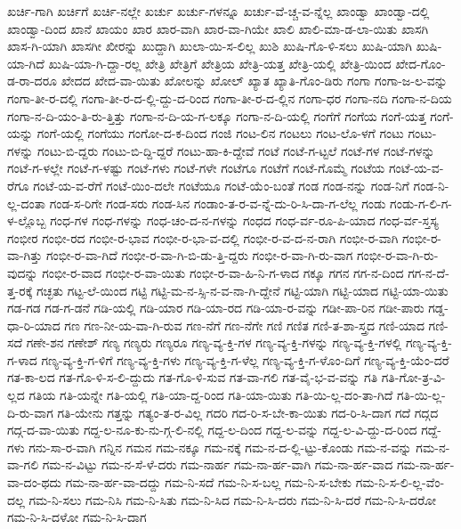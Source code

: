 {ಖರ್ಚಿ-ಗಾಗಿ
ಖರ್ಚಿಗೆ
ಖರ್ಚಿ-ನಲ್ಲೇ
ಖರ್ಚು
ಖರ್ಚು-ಗಳನ್ನೂ
ಖರ್ಚು-ವೆ-ಚ್ಚ-ವ-ನ್ನೆಲ್ಲ
ಖಾಂಡ್ವಾ
ಖಾಂಡ್ವಾ-ದಲ್ಲಿ
ಖಾಂಡ್ವಾ-ದಿಂದ
ಖಾನೆ
ಖಾಯಂ
ಖಾರ
ಖಾರ-ವಾಗಿ
ಖಾರ-ವಾ-ಗಿಯೇ
ಖಾಲಿ
ಖಾಲಿ-ಮಾ-ಡ-ಲಾ-ಯಿತು
ಖಾಸಗಿ
ಖಾಸ-ಗಿ-ಯಾಗಿ
ಖಾಸಗೀ
ಖೀರನ್ನು
ಖುದ್ದಾಗಿ
ಖುಲಾ-ಯಿ-ಸ-ಲಿಲ್ಲ
ಖುಶಿ
ಖುಷಿ-ಗೊ-ಳಿ-ಸಲು
ಖುಷಿ-ಯಾಗಿ
ಖುಷಿ-ಯಾ-ಗಿದೆ
ಖುಷಿ-ಯಾ-ಗಿ-ದ್ದಾ-ರಲ್ಲ
ಖೇತ್ರಿ
ಖೇತ್ರಿಗೆ
ಖೇತ್ರಿಯ
ಖೇತ್ರಿ-ಯತ್ತ
ಖೇತ್ರಿ-ಯಲ್ಲಿ
ಖೇತ್ರಿ-ಯಿಂದ
ಖೇದ-ಗೊಂ-ಡ-ರಾ-ದರೂ
ಖೇದದ
ಖೇದ-ವಾ-ಯಿತು
ಖೋಲನ್ನು
ಖೋಲ್
ಖ್ಯಾತ
ಖ್ಯಾತಿ-ಗೊಂ-ಡಿರು
ಗಂಗಾ
ಗಂಗಾ-ಜ-ಲ-ವನ್ನು
ಗಂಗಾ-ತೀ-ರ-ದಲ್ಲಿ
ಗಂಗಾ-ತೀ-ರ-ದ-ಲ್ಲಿ-ದ್ದು-ದ-ರಿಂದ
ಗಂಗಾ-ತೀ-ರ-ದ-ಲ್ಲಿನ
ಗಂಗಾ-ಧರ
ಗಂಗಾ-ನದಿ
ಗಂಗಾ-ನ-ದಿಯ
ಗಂಗಾ-ನ-ದಿ-ಯಂ-ತಿ-ರು-ತ್ತಿತ್ತು
ಗಂಗಾ-ನ-ದಿ-ಯ-ಗ-ಲಕ್ಕೂ
ಗಂಗಾ-ನ-ದಿ-ಯಲ್ಲಿ
ಗಂಗೆಗೆ
ಗಂಗೆಯ
ಗಂಗೆ-ಯತ್ತ
ಗಂಗೆ-ಯನ್ನು
ಗಂಗೆ-ಯಲ್ಲಿ
ಗಂಗೆಯು
ಗಂಗೋ-ದ-ಕ-ದಿಂದ
ಗಂಜಿ
ಗಂಟ-ಲಿನ
ಗಂಟಲು
ಗಂಟ-ಲೊ-ಳಗೆ
ಗಂಟು
ಗಂಟು-ಗಳನ್ನು
ಗಂಟು-ಬಿ-ದ್ದರು
ಗಂಟು-ಬಿ-ದ್ದಿ-ದ್ದರೆ
ಗಂಟು-ಹಾ-ಕಿ-ದ್ದೇವೆ
ಗಂಟೆ
ಗಂಟೆ-ಗ-ಟ್ಟಲೆ
ಗಂಟೆ-ಗಳ
ಗಂಟೆ-ಗಳನ್ನು
ಗಂಟೆ-ಗ-ಳಲ್ಲೇ
ಗಂಟೆ-ಗ-ಳಷ್ಟು
ಗಂಟೆ-ಗಳು
ಗಂಟೆ-ಗಳೇ
ಗಂಟೆಗೂ
ಗಂಟೆಗೆ
ಗಂಟೆ-ಗೊಮ್ಮೆ
ಗಂಟೆಯ
ಗಂಟೆ-ಯ-ವ-ರೆಗೂ
ಗಂಟೆ-ಯ-ವ-ರೆಗೆ
ಗಂಟೆ-ಯಿಂ-ದಲೇ
ಗಂಟೆಯೂ
ಗಂಟೆ-ಯೆಂ-ಬಂತೆ
ಗಂಡ
ಗಂಡ-ನನ್ನು
ಗಂಡ-ನಿಗೆ
ಗಂಡ-ನಿ-ಲ್ಲ-ದಂತಾ
ಗಂಡ-ಸ-ರಿಗೇ
ಗಂಡ-ಸರು
ಗಂಡ-ಸಿನ
ಗಂಡಾಂ-ತ-ರ-ವ-ನ್ನೆ-ದು-ರಿ-ಸಿ-ದಾ-ಗ-ಲೆಲ್ಲ
ಗಂಡು
ಗಂಡು-ಗ-ಲಿ-ಗ-ಳ-ಲ್ಲೊಬ್ಬ
ಗಂಧ-ಗಳ
ಗಂಧ-ಗಳನ್ನು
ಗಂಧ-ಚಂ-ದ-ನ-ಗಳನ್ನು
ಗಂಧದ
ಗಂಧ-ರ್ವ-ರೂ-ಪಿ-ಯಾದ
ಗಂಧ-ರ್ವ-ಸ್ತಸ್ಯ
ಗಂಭೀರ
ಗಂಭೀ-ರದ
ಗಂಭೀ-ರ-ಭಾವ
ಗಂಭೀ-ರ-ಭಾ-ವ-ದಲ್ಲಿ
ಗಂಭೀ-ರ-ವ-ದ-ನ-ರಾಗಿ
ಗಂಭೀ-ರ-ವಾಗಿ
ಗಂಭೀ-ರ-ವಾ-ಗಿತ್ತು
ಗಂಭೀ-ರ-ವಾ-ಗಿದೆ
ಗಂಭೀ-ರ-ವಾ-ಗಿ-ಬಿ-ಡು-ತ್ತಿ-ದ್ದರು
ಗಂಭೀ-ರ-ವಾ-ಗಿ-ರು-ವಾಗ
ಗಂಭೀ-ರ-ವಾ-ಗಿ-ರು-ವುದನ್ನು
ಗಂಭೀ-ರ-ವಾದ
ಗಂಭೀ-ರ-ವಾ-ಯಿತು
ಗಂಭೀ-ರ-ವಾ-ಹಿ-ನಿ-ಗ-ಳಾದ
ಗಕ್ಕೂ
ಗಗನ
ಗಗ-ನ-ದಿಂದ
ಗಗ-ನ-ದೆ-ತ್ತ-ರಕ್ಕೆ
ಗಚ್ಛತು
ಗಟ್ಟ-ಲೆ-ಯಿಂದ
ಗಟ್ಟಿ
ಗಟ್ಟಿ-ಮ-ನ-ಸ್ಸಿ-ನ-ವ-ನಾ-ಗಿ-ದ್ದೇನೆ
ಗಟ್ಟಿ-ಯಾಗಿ
ಗಟ್ಟಿ-ಯಾದ
ಗಟ್ಟಿ-ಯಾ-ಯಿತು
ಗಡ-ಗಡ
ಗಡ-ಗ-ಡನೆ
ಗಡಿ-ಯಲ್ಲಿ
ಗಡಿ-ಯಾರ
ಗಡಿ-ಯಾ-ರದ
ಗಡಿ-ಯಾ-ರ-ವನ್ನು
ಗಡೀ-ಪಾ-ರಿನ
ಗಡೀ-ಪಾರು
ಗಡ್ಡ-ಧಾ-ರಿ-ಯಾದ
ಗಣ
ಗಣ-ನೀ-ಯ-ವಾ-ಗಿ-ರುವ
ಗಣ-ನೆಗೆ
ಗಣ-ನೆಗೇ
ಗಣಿ
ಗಣಿತ
ಗಣಿ-ತ-ಶಾ-ಸ್ತ್ರದ
ಗಣಿ-ಯಾದ
ಗಣಿ-ಸದೆ
ಗಣೇ-ಶನ
ಗಣೇಶ್
ಗಣ್ಯ
ಗಣ್ಯರು
ಗಣ್ಯರೂ
ಗಣ್ಯ-ವ್ಯ-ಕ್ತಿ-ಗಳ
ಗಣ್ಯ-ವ್ಯ-ಕ್ತಿ-ಗಳನ್ನು
ಗಣ್ಯ-ವ್ಯ-ಕ್ತಿ-ಗಳಲ್ಲಿ
ಗಣ್ಯ-ವ್ಯ-ಕ್ತಿ-ಗ-ಳಾದ
ಗಣ್ಯ-ವ್ಯ-ಕ್ತಿ-ಗ-ಳಿಗೆ
ಗಣ್ಯ-ವ್ಯ-ಕ್ತಿ-ಗಳು
ಗಣ್ಯ-ವ್ಯ-ಕ್ತಿ-ಗ-ಳೆಲ್ಲ
ಗಣ್ಯ-ವ್ಯ-ಕ್ತಿ-ಗ-ಳೊಂ-ದಿಗೆ
ಗಣ್ಯ-ವ್ಯ-ಕ್ತಿ-ಯೆಂ-ದರೆ
ಗತ-ಕಾ-ಲದ
ಗತ-ಗೊ-ಳಿ-ಸ-ಲಿ-ದ್ದುದು
ಗತ-ಗೊ-ಳಿ-ಸುವ
ಗತ-ವಾ-ಗಲಿ
ಗತ-ವೈ-ಭ-ವ-ವನ್ನು
ಗತಿ
ಗತಿ-ಗೋ-ತ್ರ-ವಿ-ಲ್ಲದ
ಗತಿಯ
ಗತಿ-ಯನ್ನೇ
ಗತಿ-ಯಲ್ಲಿ
ಗತಿ-ಯಾ-ದ್ದ-ರಿಂದ
ಗತಿ-ಯಾ-ಯಿತು
ಗತಿ-ಯಿ-ಲ್ಲ-ದಂ-ತಾ-ಗಿದೆ
ಗತಿ-ಯಿ-ಲ್ಲ-ದಿ-ರು-ವಾಗ
ಗತಿ-ಯೇನು
ಗತ್ತನ್ನು
ಗತ್ಯಂ-ತ-ರ-ವಿಲ್ಲ
ಗದರಿ
ಗದ-ರಿ-ಸ-ಬೇ-ಕಾ-ಯಿತು
ಗದ-ರಿ-ಸಿ-ದಾಗ
ಗದೆ
ಗದ್ಗದ
ಗದ್ಗ-ದ-ವಾ-ಯಿತು
ಗದ್ದ-ಲ-ನೂ-ಕು-ನು-ಗ್ಗ-ಲಿ-ನಲ್ಲಿ
ಗದ್ದ-ಲ-ದಿಂದ
ಗದ್ದ-ಲ-ವನ್ನು
ಗದ್ದ-ಲ-ವಿ-ದ್ದು-ದ-ರಿಂದ
ಗದ್ದೆ-ಗಳು
ಗನು-ಸಾ-ರ-ವಾಗಿ
ಗನ್ನಿನ
ಗಮನ
ಗಮ-ನಕ್ಕೂ
ಗಮ-ನಕ್ಕೆ
ಗಮ-ನ-ದ-ಲ್ಲಿ-ಟ್ಟು-ಕೊಂಡು
ಗಮ-ನ-ವನ್ನು
ಗಮ-ನ-ವಾ-ಗಲಿ
ಗಮ-ನ-ವಿಟ್ಟು
ಗಮ-ನ-ಸೆ-ಳೆ-ದರು
ಗಮ-ನಾರ್ಹ
ಗಮ-ನಾ-ರ್ಹ-ವಾಗಿ
ಗಮ-ನಾ-ರ್ಹ-ವಾದ
ಗಮ-ನಾ-ರ್ಹ-ವಾ-ದಂ-ಥದು
ಗಮ-ನಾ-ರ್ಹ-ವಾ-ದದ್ದು
ಗಮ-ನಿ-ಸದೆ
ಗಮ-ನಿ-ಸ-ಬಲ್ಲ
ಗಮ-ನಿ-ಸ-ಬೇಕು
ಗಮ-ನಿ-ಸ-ಲಿ-ಲ್ಲ-ವೆಂ-ದಲ್ಲ
ಗಮ-ನಿ-ಸಲು
ಗಮ-ನಿಸಿ
ಗಮ-ನಿ-ಸಿತು
ಗಮ-ನಿ-ಸಿದ
ಗಮ-ನಿ-ಸಿ-ದರು
ಗಮ-ನಿ-ಸಿ-ದರೆ
ಗಮ-ನಿ-ಸಿ-ದರೋ
ಗಮ-ನಿ-ಸಿ-ದಳೋ
ಗಮ-ನಿ-ಸಿ-ದಾಗ
}

